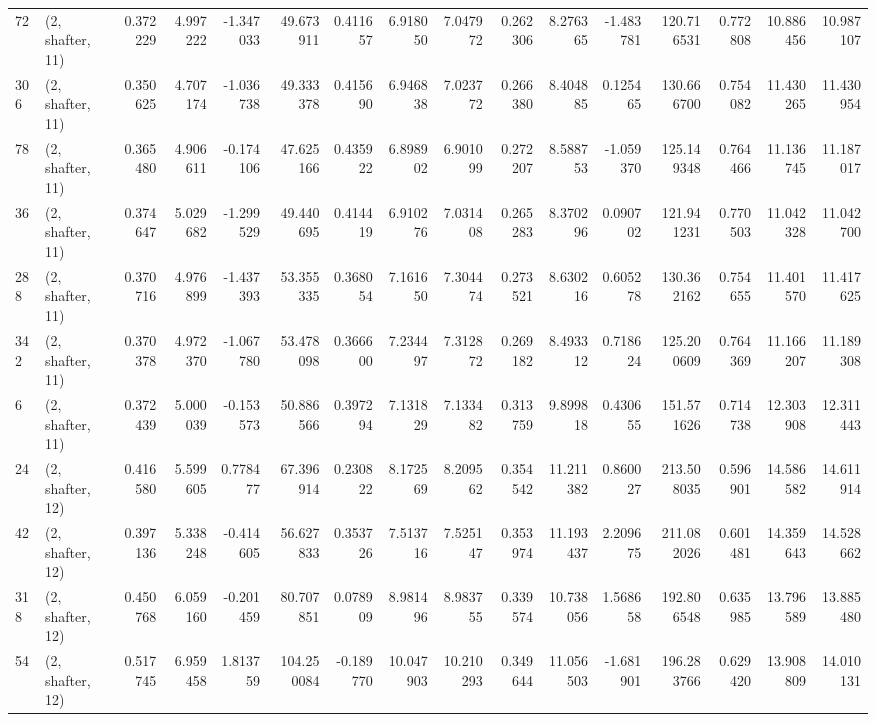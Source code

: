 \begin{tabular}{llrrrrrrrrrrrrrr}
72  &  (2, shafter, 11) &   0.372229 &   4.997222 &  -1.347033 &    49.673911 &   0.411657 &   6.918050 &   7.047972 &  0.262306 &   8.276365 &  -1.483781 &   120.716531 &  0.772808 &  10.886456 &  10.987107 \\
306 &  (2, shafter, 11) &   0.350625 &   4.707174 &  -1.036738 &    49.333378 &   0.415690 &   6.946838 &   7.023772 &  0.266380 &   8.404885 &   0.125465 &   130.666700 &  0.754082 &  11.430265 &  11.430954 \\
78  &  (2, shafter, 11) &   0.365480 &   4.906611 &  -0.174106 &    47.625166 &   0.435922 &   6.898902 &   6.901099 &  0.272207 &   8.588753 &  -1.059370 &   125.149348 &  0.764466 &  11.136745 &  11.187017 \\
36  &  (2, shafter, 11) &   0.374647 &   5.029682 &  -1.299529 &    49.440695 &   0.414419 &   6.910276 &   7.031408 &  0.265283 &   8.370296 &   0.090702 &   121.941231 &  0.770503 &  11.042328 &  11.042700 \\
288 &  (2, shafter, 11) &   0.370716 &   4.976899 &  -1.437393 &    53.355335 &   0.368054 &   7.161650 &   7.304474 &  0.273521 &   8.630216 &   0.605278 &   130.362162 &  0.754655 &  11.401570 &  11.417625 \\
342 &  (2, shafter, 11) &   0.370378 &   4.972370 &  -1.067780 &    53.478098 &   0.366600 &   7.234497 &   7.312872 &  0.269182 &   8.493312 &   0.718624 &   125.200609 &  0.764369 &  11.166207 &  11.189308 \\
6   &  (2, shafter, 11) &   0.372439 &   5.000039 &  -0.153573 &    50.886566 &   0.397294 &   7.131829 &   7.133482 &  0.313759 &   9.899818 &   0.430655 &   151.571626 &  0.714738 &  12.303908 &  12.311443 \\
24  &  (2, shafter, 12) &   0.416580 &   5.599605 &   0.778477 &    67.396914 &   0.230822 &   8.172569 &   8.209562 &  0.354542 &  11.211382 &   0.860027 &   213.508035 &  0.596901 &  14.586582 &  14.611914 \\
42  &  (2, shafter, 12) &   0.397136 &   5.338248 &  -0.414605 &    56.627833 &   0.353726 &   7.513716 &   7.525147 &  0.353974 &  11.193437 &   2.209675 &   211.082026 &  0.601481 &  14.359643 &  14.528662 \\
318 &  (2, shafter, 12) &   0.450768 &   6.059160 &  -0.201459 &    80.707851 &   0.078909 &   8.981496 &   8.983755 &  0.339574 &  10.738056 &   1.568658 &   192.806548 &  0.635985 &  13.796589 &  13.885480 \\
54  &  (2, shafter, 12) &   0.517745 &   6.959458 &   1.813759 &   104.250084 &  -0.189770 &  10.047903 &  10.210293 &  0.349644 &  11.056503 &  -1.681901 &   196.283766 &  0.629420 &  13.908809 &  14.010131 \\

\end{tabular}
